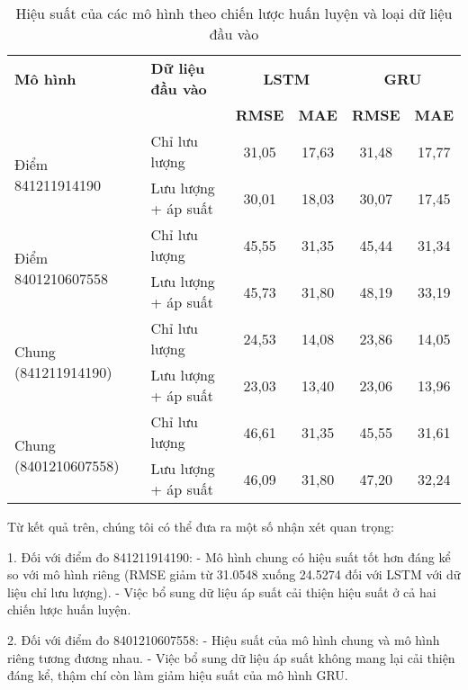 \begin{table}[htbp]
    \centering
    \begin{tabular}{|p{4.5cm}|p{3.5cm}|c|c|c|c|}
        \hline
        \textbf{Mô hình} & \textbf{Dữ liệu đầu vào} & \multicolumn{2}{c|}{\textbf{LSTM}} & \multicolumn{2}{c|}{\textbf{GRU}} \\
        \cline{3-6}
        & & \textbf{RMSE} & \textbf{MAE} & \textbf{RMSE} & \textbf{MAE} \\
        \hline
        \multirow{2}{*}{Điểm 841211914190} & Chỉ lưu lượng & 31,05 & 17,63 & 31,48 & 17,77 \\
        \cline{2-6}
        & Lưu lượng + áp suất & 30,01 & 18,03 & 30,07 & 17,45 \\
        \hline
        \multirow{2}{*}{Điểm 8401210607558} & Chỉ lưu lượng & 45,55 & 31,35 & 45,44 & 31,34 \\
        \cline{2-6}
        & Lưu lượng + áp suất & 45,73 & 31,80 & 48,19 & 33,19 \\
        \hline
        \multirow{2}{*}{Chung (841211914190)} & Chỉ lưu lượng & 24,53 & 14,08 & 23,86 & 14,05 \\
        \cline{2-6}
        & Lưu lượng + áp suất & 23,03 & 13,40 & 23,06 & 13,96 \\
        \hline
        \multirow{2}{*}{Chung (8401210607558)} & Chỉ lưu lượng & 46,61 & 31,35 & 45,55 & 31,61 \\
        \cline{2-6}
        & Lưu lượng + áp suất & 46,09 & 31,80 & 47,20 & 32,24 \\
        \hline
    \end{tabular}
    \caption{Hiệu suất của các mô hình theo chiến lược huấn luyện và loại dữ liệu đầu vào}
    \label{tab:model_performance_detailed}
\end{table}

Từ kết quả trên, chúng tôi có thể đưa ra một số nhận xét quan trọng:

1. Đối với điểm đo 841211914190:
   - Mô hình chung có hiệu suất tốt hơn đáng kể so với mô hình riêng (RMSE giảm từ 31.0548 xuống 24.5274 đối với LSTM với dữ liệu chỉ lưu lượng).
   - Việc bổ sung dữ liệu áp suất cải thiện hiệu suất ở cả hai chiến lược huấn luyện.

2. Đối với điểm đo 8401210607558:
   - Hiệu suất của mô hình chung và mô hình riêng tương đương nhau.
   - Việc bổ sung dữ liệu áp suất không mang lại cải thiện đáng kể, thậm chí còn làm giảm hiệu suất của mô hình GRU.
